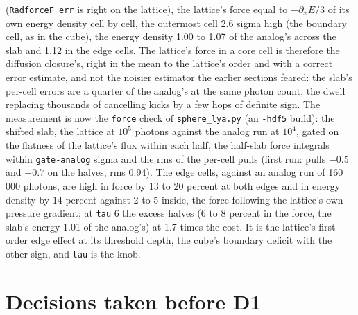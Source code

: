 \documentclass[11pt]{article}
\newcommand{\key}[1]{\texttt{#1}}
\begin{document}
(\texttt{RadforceF\_err} is right on the lattice), the lattice's force equal to
$-\partial_x E/3$ of its own energy density cell by cell, the outermost cell 2.6 sigma
high (the boundary cell, as in the cube), the energy density 1.00 to 1.07 of the
analog's across the slab and 1.12 in the edge cells.  The lattice's force in a core
cell is therefore the diffusion closure's, right in the mean to the lattice's order and
with a correct error estimate, and not the noisier estimator the earlier sections
feared: the slab's per-cell errors are a quarter of the analog's at the same photon
count, the dwell replacing thousands of cancelling kicks by a few hops of definite
sign.  The measurement is now the \texttt{force} check of \texttt{sphere\_lya.py} (an
\texttt{-hdf5} build): the shifted slab, the lattice at $10^5$ photons against the
analog run at $10^4$, gated on the flatness of the lattice's flux within each half,
the half-slab force integrals within \key{gate-analog} sigma and the rms of the
per-cell pulls (first run: pulls $-0.5$ and $-0.7$ on the halves, rms 0.94).  The
edge cells, against an analog run of 160\,000 photons, are high in force by 13 to 20
percent at both edges and in energy density by 14 percent against 2 to 5 inside, the
force following the lattice's own pressure gradient; at \key{tau} 6 the excess halves
(6 to 8 percent in the force, the slab's energy 1.01 of the analog's) at 1.7 times the
cost.  It is the lattice's first-order edge effect at its threshold depth, the cube's
boundary deficit with the other sign, and \key{tau} is the knob.

\section{Decisions taken before D1}
\label{sec:decisions}
\end{document}
